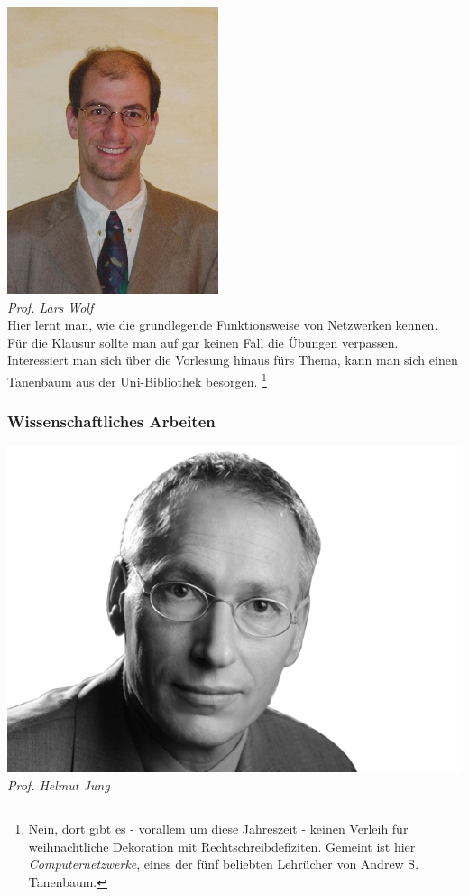 \includegraphics[width=0.8\linewidth]{bilder/dozenten/wolf}\\
\textit{Prof. Lars Wolf}\\
Hier lernt man, wie die grundlegende Funktionsweise von Netzwerken
kennen. Für die Klausur sollte man auf gar keinen Fall die Übungen
verpassen. Interessiert man sich über die Vorlesung hinaus fürs Thema,
kann man sich einen Tanenbaum aus der Uni-Bibliothek besorgen.
\footnote{Nein, dort gibt es - vorallem um diese Jahreszeit - keinen 
Verleih für weihnachtliche Dekoration mit Rechtschreibdefiziten. 
Gemeint ist hier \textit{Computernetzwerke}, eines der fünf 
beliebten Lehrücher von Andrew S. Tanenbaum.}

\newpage
\subsubsection{Wissenschaftliches Arbeiten}

\includegraphics[width=0.9\linewidth]{bilder/dozenten/jung_frei.png}\\
\textit{Prof. Helmut Jung}

